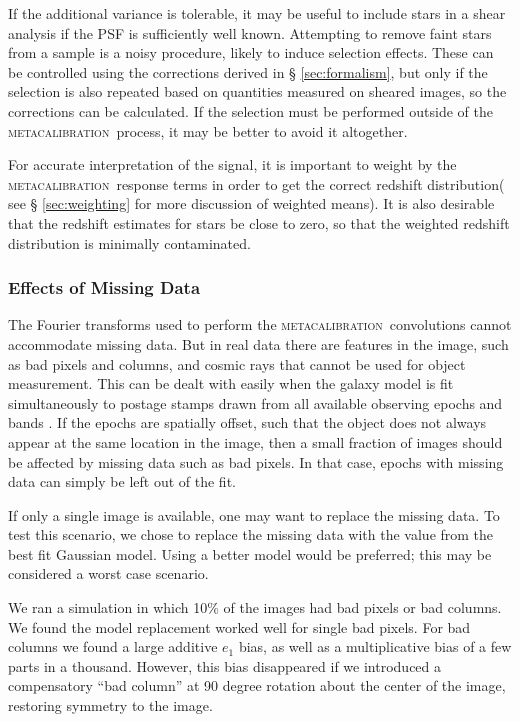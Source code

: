 \documentclass[iop]{emulateapj}
\newcommand{\mcal}{\textsc{metacalibration}}
\begin{document}
If the additional variance is tolerable, it may be useful to include stars in a
shear analysis if the PSF is sufficiently well known.  Attempting to remove
faint stars from a sample is a noisy procedure, likely to induce selection
effects.  These can be controlled using the corrections derived in \S
\ref{sec:formalism}, but only if the selection is also repeated based on
quantities measured on sheared images, so the corrections can be calculated.
If the selection must be performed outside of the \mcal\ process, it may be
better to avoid it altogether.

For accurate interpretation of the signal, it is important to weight by the
\mcal\ response terms in order to get the correct redshift distribution( see \S
\ref{sec:weighting} for more discussion of weighted means).  It is also
desirable that the redshift estimates for stars be close to zero, so that the
weighted redshift distribution is minimally contaminated.






\subsubsection{Effects of Missing Data}

The Fourier transforms used to perform the \mcal\ convolutions cannot
accommodate missing data.  But in real data there are features in the image,
such as bad pixels and columns, and cosmic rays that cannot be used for object
measurement.  This can be dealt with easily when the galaxy model is fit
simultaneously to postage stamps drawn from all available observing epochs and
bands \citep[e.g.][]{Jarvis2016}.  If the epochs are spatially offset, such
that the object does not always appear at the same location in the image, then
a small fraction of images should be affected by missing data such as bad
pixels.  In that case, epochs with missing data can simply be left out of the
fit.

If only a single image is available, one may want to replace the missing data.
To test this scenario, we chose to replace the missing data with the value from
the best fit Gaussian model.  Using a better model would be preferred; this may
be considered a worst case scenario.

We ran a simulation in which 10\% of the images had bad pixels or bad columns.
We found the model replacement worked well for single bad pixels. For bad
columns we found a large additive $e_1$ bias, as well as a multiplicative bias
of a few parts in a thousand.  However, this bias disappeared if we introduced
a compensatory ``bad column'' at 90 degree rotation about the center of the
image, restoring symmetry to the image. 
\end{document}
